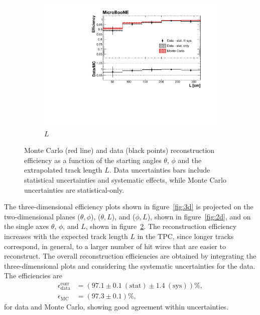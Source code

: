 \documentclass[a4paper,11pt]{article}
\begin{document}
\begin{figure}[htbp]
\begin{center}
\begin{subfigure}{0.5\textwidth}
      \includegraphics[width=\linewidth]{figures/l2.pdf}
      \caption{$L$} \label{fig:l}
    \end{subfigure}
    \caption{Monte Carlo (red line) and data (black points) reconstruction efficiency as a function of the starting angles $\theta$, $\phi$ and the extrapolated track length $L$. Data uncertainties bars include statistical uncertainties and systematic effects, while Monte Carlo uncertainties are statistical-only.}\label{fig:1d}
  \end{center}
\end{figure}

The three-dimensional efficiency plots shown in figure~\ref{fig:3d} is projected on the two-dimensional planes ($\theta,\phi$), ($\theta,L$), and ($\phi,L$), shown in figure~\ref{fig:2d}, and on the single axes $\theta$, $\phi$, and $L$, shown in figure~\ref{fig:1d}.
The reconstruction efficiency increases with the expected track length $L$ in the TPC, since longer tracks correspond, in general, to a larger number of hit wires that are easier to reconstruct.
The overall reconstruction efficiencies are obtained by integrating the three-dimensional plots and considering the systematic uncertainties for the data. The efficiencies are
\begin{align}
\epsilon_{\mathrm{data}}^{\mathrm{corr}} &= (97.1 \pm 0.1~\mathrm{(stat)} \pm 1.4~\mathrm{(sys)})\%,\\
\epsilon_{\mathrm{MC}} &= (97.3 \pm 0.1)\%,\nonumber
\end{align} for data and Monte Carlo, showing good agreement within uncertainties.
\end{document}
